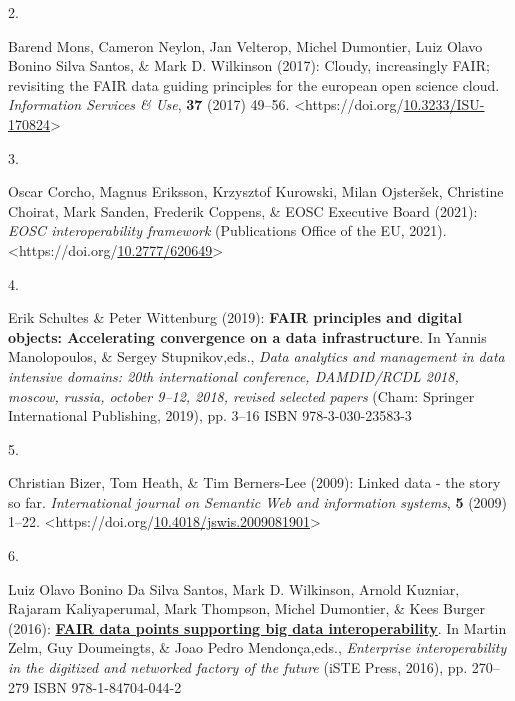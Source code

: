 \begin{thebibliography}{9}
\hypertarget{ref-monsCloudyIncreasinglyFAIR2017b}{}
2.

Barend Mons, Cameron Neylon, Jan Velterop, Michel Dumontier, Luiz Olavo
Bonino Silva Santos, \& Mark D. Wilkinson (2017): Cloudy, increasingly
{FAIR}; revisiting the {FAIR} data guiding principles for the european
open science cloud. \emph{Information Services \& Use}, \textbf{37}
(2017) 49--56.
\textless https://doi.org/\href{https://doi.org/10.3233/ISU-170824}{10.3233/ISU-170824}\textgreater{}

\hypertarget{ref-corchoEOSCInteroperabilityFramework2021b}{}
3.

Oscar Corcho, Magnus Eriksson, Krzysztof Kurowski, Milan Ojsteršek,
Christine Choirat, Mark Sanden, Frederik Coppens, \& EOSC Executive
Board (2021): \emph{{EOSC} interoperability framework} ({Publications
Office of the EU}, 2021).
\textless https://doi.org/\href{https://doi.org/10.2777/620649}{10.2777/620649}\textgreater{}

\hypertarget{ref-schultesFAIRPrinciplesDigital2019a}{}
4.

Erik Schultes \& Peter Wittenburg (2019): \textbf{{FAIR} principles and
digital objects: {Accelerating} convergence on a data infrastructure}.
In Yannis Manolopoulos, \& Sergey Stupnikov,eds., \emph{Data analytics
and management in data intensive domains: 20th international conference,
{DAMDID}/{RCDL} 2018, moscow, russia, october 9--12, 2018, revised
selected papers} ({Cham}: {Springer International Publishing}, 2019),
pp. 3--16 ISBN 978-3-030-23583-3

\hypertarget{ref-bizerLinkedDataStory2009a}{}
5.

Christian Bizer, Tom Heath, \& Tim Berners-Lee (2009): Linked data - the
story so far. \emph{International journal on Semantic Web and
information systems}, \textbf{5} (2009) 1--22.
\textless https://doi.org/\href{https://doi.org/10.4018/jswis.2009081901}{10.4018/jswis.2009081901}\textgreater{}

\hypertarget{ref-boninodasilvasantosFAIRDataPoints2016a}{}
6.

Luiz Olavo Bonino Da Silva Santos, Mark D. Wilkinson, Arnold Kuzniar,
Rajaram Kaliyaperumal, Mark Thompson, Michel Dumontier, \& Kees Burger
(2016):
\textbf{\href{https://www.researchgate.net/publication/309468587_FAIR_Data_Points_Supporting_Big_Data_Interoperability}{{FAIR}
data points supporting big data interoperability}}. In Martin Zelm, Guy
Doumeingts, \& Joao Pedro Mendonça,eds., \emph{Enterprise
interoperability in the digitized and networked factory of the future}
({iSTE Press}, 2016), pp. 270--279 ISBN 978-1-84704-044-2


\end{thebibliography}
